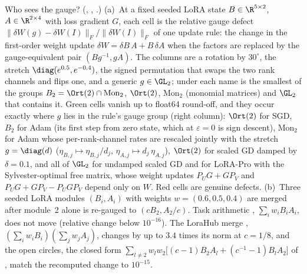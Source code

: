 Who sees the gauge? (, , .) (a)~At a fixed
seeded LoRA state $B\in\R^{5\times2}$, $A\in\R^{2\times4}$ with loss gradient $G$, each cell is the relative gauge defect
$\lVert\delta W(g)-\delta W(I)\rVert_F/\lVert\delta W(I)\rVert_F$ of one update rule: the change in the first-order
weight update $\delta W=\delta B\,A+B\,\delta A$ when the factors are replaced by the gauge-equivalent pair
$(Bg^{-1},gA)$. The columns are a rotation by $30^\circ$, the stretch $\diag(e^{0.5},e^{-0.4})$, the signed permutation
that swaps the two rank channels and flips one, and a generic $g\in\GL_2$; under each name is the smallest of the groups
$B_2=\Ort(2)\cap\mathrm{Mon}_2$, $\Ort(2)$, $\mathrm{Mon}_2$ (monomial matrices) and $\GL_2$ that contains it. Green
cells vanish up to float64 round-off, and they occur exactly where $g$ lies in the rule's gauge group (right column):
$\Ort(2)$ for SGD, $B_2$ for Adam (its first step from zero state, which at $\varepsilon=0$ is sign descent),
$\mathrm{Mon}_2$ for Adam whose per-rank-channel rates are rescaled jointly with the stretch $g=\diag(d)$
($\eta_{B,j}\mapsto\eta_{B,j}/d_j$, $\eta_{A,j}\mapsto d_j\,\eta_{A,j}$), $\Ort(2)$ for scaled GD damped by $\delta=0.1$,
and all of $\GL_2$ for undamped scaled GD and for LoRA-Pro with the Sylvester-optimal free matrix, whose weight updates
$P_UG+GP_V$ and $P_UG+GP_V-P_UGP_V$ depend only on $W$. Red cells are genuine defects. (b)~Three seeded LoRA modules
$(B_i,A_i)$ with weights $w=(0.6,0.5,0.4)$ are merged after module~2 alone is re-gauged to $(cB_2,A_2/c)$. Task
arithmetic \citep{ilharco2022editing}, $\sum_iw_iB_iA_i$, does not move (relative change below $10^{-16}$). The LoraHub
merge \citep{huang2023lorahub}, $(\sum_iw_iB_i)(\sum_jw_jA_j)$, changes by up to $3.4$ times its norm at $c=1/8$, and
the open circles, the closed form $\sum_{l\ne2}w_lw_2\big[(c-1)B_2A_l+(c^{-1}-1)B_lA_2\big]$ of
, match the recomputed change to $10^{-15}$.
